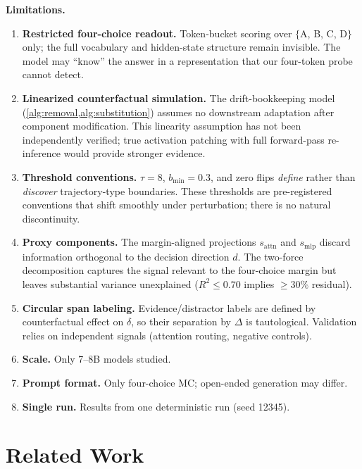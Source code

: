 \documentclass{article}
\begin{document}
\textbf{Limitations.}
\vspace{-0.5em}
\begin{enumerate}\setlength{\itemsep}{0pt}
\item \textbf{Restricted four-choice readout.}  Token-bucket scoring over $\{$A, B, C, D$\}$ only; the full vocabulary and hidden-state structure remain invisible.  The model may ``know'' the answer in a representation that our four-token probe cannot detect.
\item \textbf{Linearized counterfactual simulation.}  The drift-bookkeeping model (\cref{alg:removal,alg:substitution}) assumes no downstream adaptation after component modification.  This linearity assumption has not been independently verified; true activation patching with full forward-pass re-inference would provide stronger evidence.
\item \textbf{Threshold conventions.}  $\tau = 8$, $b_{\min} = 0.3$, and zero flips \emph{define} rather than \emph{discover} trajectory-type boundaries.  These thresholds are pre-registered conventions that shift smoothly under perturbation; there is no natural discontinuity.
\item \textbf{Proxy components.}  The margin-aligned projections $s_{\mathrm{attn}}$ and $s_{\mathrm{mlp}}$ discard information orthogonal to the decision direction $d$.  The two-force decomposition captures the signal relevant to the four-choice margin but leaves substantial variance unexplained ($R^2 \leq 0.70$ implies ${\geq}30\%$ residual).
\item \textbf{Circular span labeling.}  Evidence/distractor labels are defined by counterfactual effect on $\delta$, so their separation by $\Delta$ is tautological.  Validation relies on independent signals (attention routing, negative controls).
\item \textbf{Scale.}  Only 7--8B models studied.
\item \textbf{Prompt format.}  Only four-choice MC; open-ended generation may differ.
\item \textbf{Single run.}  Results from one deterministic run (seed 12345).
\end{enumerate}


\section{Related Work}
\end{document}
